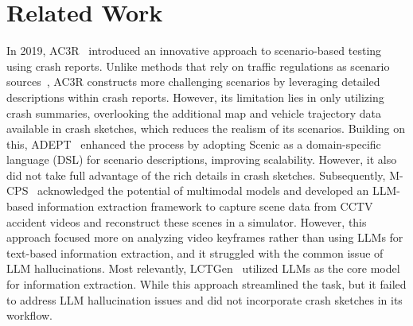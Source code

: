 \section{Related Work}
\label{sec:re_work}

In 2019, AC3R~\cite{gambi2019generating} introduced an innovative approach to scenario-based testing using crash reports. Unlike methods that rely on traffic regulations as scenario sources~\cite{sun2022lawbreaker,deng2021rmt}, AC3R constructs more challenging scenarios by leveraging detailed descriptions within crash reports. However, its limitation lies in only utilizing crash summaries, overlooking the additional map and vehicle trajectory data available in crash sketches, which reduces the realism of its scenarios. Building on this, ADEPT~\cite{wang2022adept} enhanced the process by adopting Scenic as a domain-specific language (DSL) for scenario descriptions, improving scalability. However, it also did not take full advantage of the rich details in crash sketches. Subsequently, M-CPS~\cite{zhang2023building} acknowledged the potential of multimodal models and developed an LLM-based information extraction framework to capture scene data from CCTV accident videos and reconstruct these scenes in a simulator. However, this approach focused more on analyzing video keyframes rather than using LLMs for text-based information extraction, and it struggled with the common issue of LLM hallucinations. Most relevantly, LCTGen~\cite{tan2023language} utilized LLMs as the core model for information extraction. While this approach streamlined the task, but it  failed to address LLM hallucination issues and did not incorporate crash sketches in its workflow.
\vspace{-2mm}
